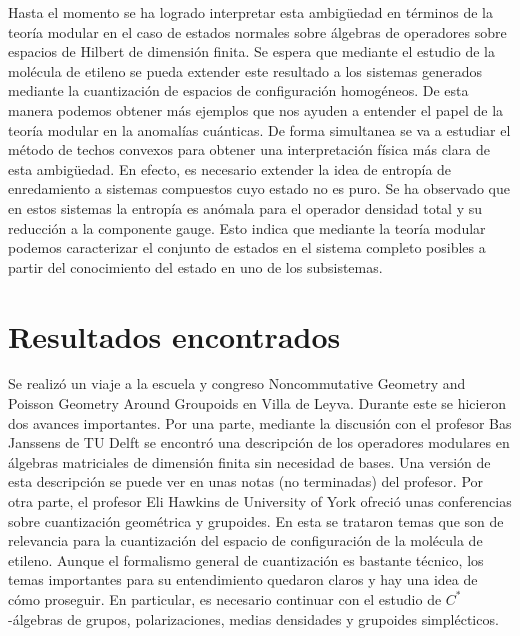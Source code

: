 \documentclass{article}
\begin{document}
Hasta el momento se ha logrado interpretar esta ambigüedad en términos de la teoría modular en el caso de estados normales sobre álgebras de operadores sobre espacios de Hilbert de dimensión finita. Se espera que mediante el estudio de la molécula de etileno\cite{Balachandran2013a} se pueda extender este resultado a los sistemas generados mediante la cuantización de espacios de configuración homogéneos. De esta manera podemos obtener más ejemplos que nos ayuden a entender el papel de la teoría modular en la anomalías cuánticas. De forma simultanea se va a estudiar el método de techos convexos para obtener una interpretación física más clara de esta ambigüedad\cite{Uhlmann2010}. En efecto, es necesario extender la idea de entropía de enredamiento a sistemas compuestos cuyo estado no es puro. Se ha observado que en estos sistemas la entropía es anómala para el operador densidad total y su reducción a la componente gauge. Esto indica que mediante la teoría modular podemos caracterizar el conjunto de estados en el sistema completo posibles a partir del conocimiento del estado en uno de los subsistemas.

\section{Resultados encontrados}

Se realizó un viaje a la escuela y congreso Noncommutative Geometry and Poisson Geometry Around Groupoids en Villa de Leyva. Durante este se hicieron dos avances importantes. Por una parte, mediante la discusión con el profesor Bas Janssens de TU Delft se encontró una descripción de los operadores modulares en álgebras matriciales de dimensión finita sin necesidad de bases. Una versión de esta descripción se puede ver en unas notas (no terminadas) del profesor\cite{Janssens2013}. Por otra parte, el profesor Eli Hawkins de University of York ofreció unas conferencias sobre cuantización geométrica y grupoides. En esta se trataron temas que son de relevancia para la cuantización del espacio de configuración de la molécula de etileno. Aunque el formalismo general de cuantización es bastante técnico, los temas importantes para su entendimiento quedaron claros y hay una idea de cómo proseguir.  En particular, es necesario continuar con el estudio de $C^*$-álgebras de grupos, polarizaciones, medias densidades y grupoides simplécticos.
\end{document}
